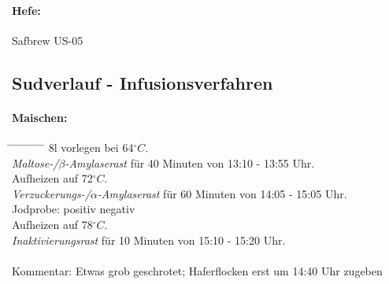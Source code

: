 \documentclass[12pt,oneside,a4paper]{scrartcl}
\begin{document}
\paragraph{Hefe:}
	{\color{green}Safbrew US-05}
%
\subsection*{Sudverlauf - Infusionsverfahren}	
%
\paragraph{Maischen:}
	\begin{tabbing}\hspace{1cm} \=
		\hspace{1cm} \= \hspace{1cm} \=\hspace{1cm} \=\hspace{1cm} \=\hspace{1cm} \= \hspace{1cm} \= \hspace{1cm} \= \hspace{1cm} \= \hspace{1cm} \= \kill
		\> {\color{green}8}l vorlegen bei {\color{green}64}$^\circ C$.\\
		\> \textit{Maltose-/$\beta$-Amylaserast} für {\color{green}40} Minuten von {\color{red}13:10} - {\color{red}13:55} Uhr.\\
		\> \> Aufheizen auf 72$^\circ C$.\\
		\> \textit{Verzuckerungs-/$\alpha$-Amylaserast} für {\color{green}60} Minuten von {\color{red}14:05} - {\color{red}15:05} Uhr.\\
		\> \> \> Jodprobe: \> \> {\color{green}\Square} positiv \> \> {\color{green}\CheckedBox} negativ\\
		\> \> Aufheizen auf 78$^\circ C$.\\
		\> \textit{Inaktivierungsrast} für {\color{green}10} Minuten von {\color{red}15:10} - {\color{red}15:20} Uhr.\\\\
		\> Kommentar: \>\>\> {\color{green}Etwas grob geschrotet; Haferflocken erst um 14:40 Uhr zugeben}
	\end{tabbing}
\end{document}
